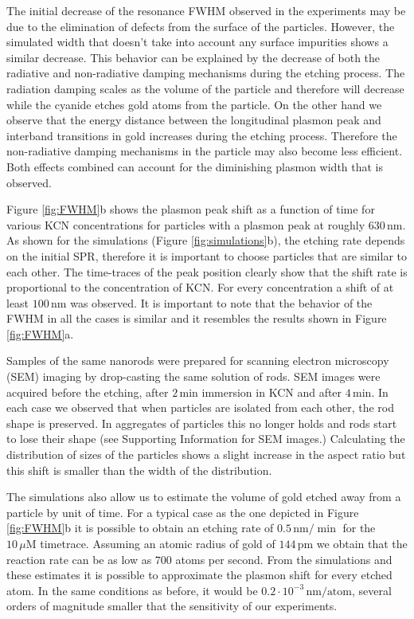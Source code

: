 \documentclass[twoside,twocolumn,11pt]{article}
\newcommand{\nm}{\ensuremath{\,\textrm{nm}}}
\newcommand{\uM}{\ensuremath{\,\mu\textrm{M}}}
\begin{document}
The initial decrease of the resonance FWHM observed in the experiments may be
due to the elimination of defects from the surface of the particles. However,
the simulated width that doesn't take into account any surface impurities shows
a similar decrease. This behavior can be explained by the decrease of both the
radiative and non-radiative damping mechanisms during the etching
process. The radiation damping scales as the volume of the
particle\cite{Wokaun1982} and therefore will decrease while the cyanide etches
gold atoms from the particle. On the other hand we observe that the energy
distance between the longitudinal plasmon peak and interband transitions in gold
increases during the etching process. Therefore the non-radiative damping
mechanisms in the particle may also become less efficient\cite{Sonnichsen2002}.
Both effects combined can account for the diminishing plasmon width that is observed.

Figure \ref{fig:FWHM}b shows the plasmon peak shift as a function of time for
various KCN concentrations for particles with a plasmon peak at roughly
$630\nm$. As shown for the simulations (Figure \ref{fig:simulations}b), the
etching rate depends on the initial SPR, therefore it is important to choose
particles that are similar to each other. The time-traces of the peak position
clearly show that the shift rate is proportional to the concentration of KCN.
For every concentration a shift of at least $100\nm$ was observed. It is
important to note that the behavior of the FWHM in all the cases is similar and
it resembles the results shown in Figure \ref{fig:FWHM}a. 

Samples of the same nanorods were prepared for scanning electron microscopy
(SEM) imaging by drop-casting the same solution of rods. SEM images were acquired
before the etching, after $2\,\textrm{min}$ immersion in KCN and after
$4\,\textrm{min}$. In each case we observed that when particles are isolated
from each other, the rod shape is preserved. In aggregates of particles this no
longer holds and rods start to lose their shape (see Supporting Information for
SEM images.) Calculating the distribution of sizes of the particles shows a
slight increase in the aspect ratio but this shift is smaller than the width of the distribution.

The simulations also allow us to estimate the volume of gold etched away from a
particle by unit of time. For a typical case as the one depicted in Figure
\ref{fig:FWHM}b it is possible to obtain an etching rate of $0.5\nm/\min$ for
the $10\uM$ timetrace. Assuming an atomic radius of gold of
$144\,\textrm{pm}$\cite{Pauling1947} we obtain that the reaction rate can be as
low as $700$ atoms per second. From the simulations and these estimates it is
possible to approximate the plasmon shift for every etched atom. In the same
conditions as before, it would be $0.2\cdot 10^{-3}\, \textrm{nm}/
\textrm{atom}$, several orders of magnitude smaller that the sensitivity of our
experiments.
\end{document}
